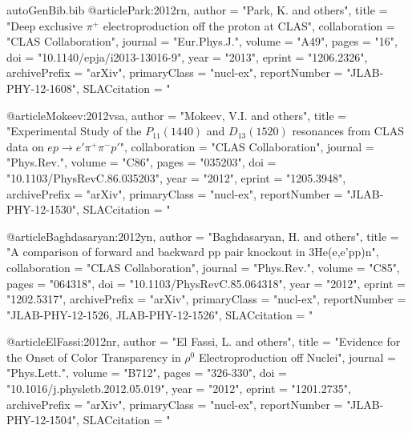 \begin{filecontents*}{autoGenBib.bib}
@article{Park:2012rn,
      author         = "Park, K. and others",
      title          = "{Deep exclusive $\pi^+$ electroproduction off the proton
                        at CLAS}",
      collaboration  = "CLAS Collaboration",
      journal        = "Eur.Phys.J.",
      volume         = "A49",
      pages          = "16",
      doi            = "10.1140/epja/i2013-13016-9",
      year           = "2013",
      eprint         = "1206.2326",
      archivePrefix  = "arXiv",
      primaryClass   = "nucl-ex",
      reportNumber   = "JLAB-PHY-12-1608",
      SLACcitation   = "%
}

@article{Mokeev:2012vsa,
      author         = "Mokeev, V.I. and others",
      title          = "{Experimental Study of the $P_{11}(1440)$ and
                        $D_{13}(1520)$ resonances from CLAS data on $ep
                        \rightarrow e'\pi^{+} \pi^{-} p'$}",
      collaboration  = "CLAS Collaboration",
      journal        = "Phys.Rev.",
      volume         = "C86",
      pages          = "035203",
      doi            = "10.1103/PhysRevC.86.035203",
      year           = "2012",
      eprint         = "1205.3948",
      archivePrefix  = "arXiv",
      primaryClass   = "nucl-ex",
      reportNumber   = "JLAB-PHY-12-1530",
      SLACcitation   = "%
}

@article{Baghdasaryan:2012yn,
      author         = "Baghdasaryan, H. and others",
      title          = "{A comparison of forward and backward pp pair knockout in
                        3He(e,e'pp)n}",
      collaboration  = "CLAS Collaboration",
      journal        = "Phys.Rev.",
      volume         = "C85",
      pages          = "064318",
      doi            = "10.1103/PhysRevC.85.064318",
      year           = "2012",
      eprint         = "1202.5317",
      archivePrefix  = "arXiv",
      primaryClass   = "nucl-ex",
      reportNumber   = "JLAB-PHY-12-1526, JLAB-PHY-12-1526",
      SLACcitation   = "%
}

@article{ElFassi:2012nr,
      author         = "El Fassi, L. and others",
      title          = "{Evidence for the Onset of Color Transparency in $\rho^0$
                        Electroproduction off Nuclei}",
      journal        = "Phys.Lett.",
      volume         = "B712",
      pages          = "326-330",
      doi            = "10.1016/j.physletb.2012.05.019",
      year           = "2012",
      eprint         = "1201.2735",
      archivePrefix  = "arXiv",
      primaryClass   = "nucl-ex",
      reportNumber   = "JLAB-PHY-12-1504",
      SLACcitation   = "%
}


\end{filecontents*}
